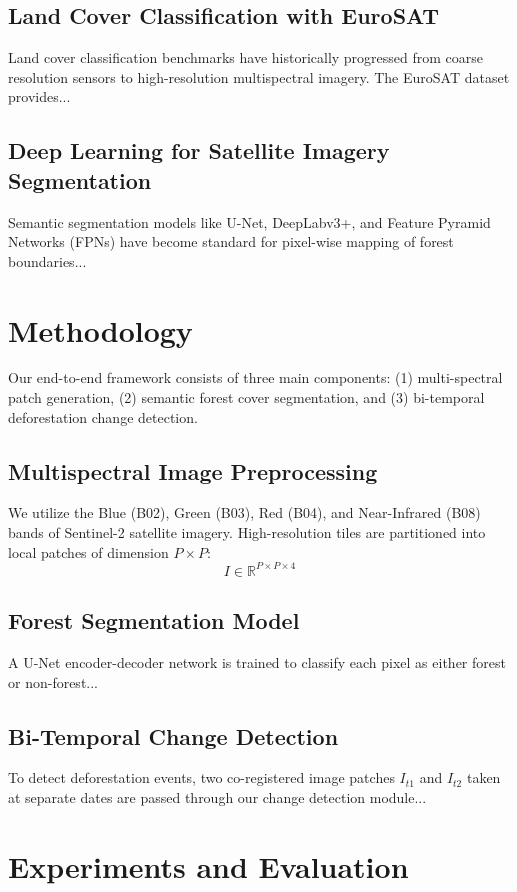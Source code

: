 \documentclass[journal,10pt]{IEEEtran}
\begin{document}
\subsection{Land Cover Classification with EuroSAT}
Land cover classification benchmarks have historically progressed from coarse resolution sensors to high-resolution multispectral imagery. The EuroSAT dataset provides...

\subsection{Deep Learning for Satellite Imagery Segmentation}
Semantic segmentation models like U-Net, DeepLabv3+, and Feature Pyramid Networks (FPNs) have become standard for pixel-wise mapping of forest boundaries...

\section{Methodology}
Our end-to-end framework consists of three main components: (1) multi-spectral patch generation, (2) semantic forest cover segmentation, and (3) bi-temporal deforestation change detection.

\subsection{Multispectral Image Preprocessing}
We utilize the Blue (B02), Green (B03), Red (B04), and Near-Infrared (B08) bands of Sentinel-2 satellite imagery. High-resolution tiles are partitioned into local patches of dimension $P \times P$:
\begin{equation}
I \in \mathbb{R}^{P \times P \times 4}
\end{equation}

\subsection{Forest Segmentation Model}
A U-Net encoder-decoder network is trained to classify each pixel as either forest or non-forest...

\subsection{Bi-Temporal Change Detection}
To detect deforestation events, two co-registered image patches $I_{t1}$ and $I_{t2}$ taken at separate dates are passed through our change detection module...

\section{Experiments and Evaluation}
\end{document}
